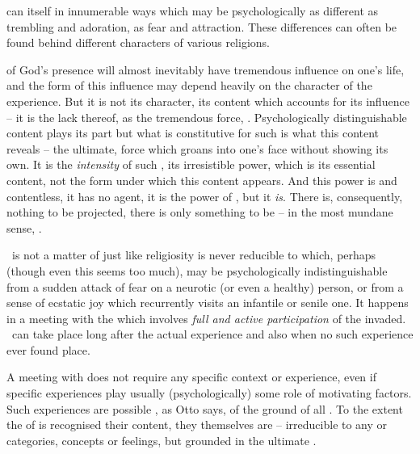  can  itself in innumerable ways which may be
psychologically as different as trembling and adoration, as fear and attraction.
These differences can often be found behind different  characters of
various religions.

 of God's presence will almost inevitably have tremendous
influence on one's life, and the form of this influence may depend heavily on
the character of the experience.  But it is not its character, its content which
accounts for its influence -- it is the lack thereof,  as the
tremendous force, .  Psychologically distinguishable content plays
its part but what is constitutive for such  is what this
content reveals -- the ultimate,  force which groans into one's
face without showing its own.  It is the {\em intensity} of such , its irresistible power, which is its essential content, not the
form under which this content appears.  And this power is  and
contentless, it has no agent, it is the power of , but it {\em
  is}. There is, consequently, nothing to be projected, there is only something
to be  -- in the most mundane sense, .

\pa \Sch\ is not a matter of  just like religiosity is never
reducible to  which, perhaps (though even this 
seems too much), may be psychologically indistinguishable from a sudden attack
of fear on a neurotic (or even a healthy) person, or from a sense of ecstatic
joy which recurrently visits an infantile or {senile} one. It happens in a
meeting with the  which involves {\em full and active
  participation} of the invaded.  \Sch\ can take place long after the actual
experience and also when no such experience ever found place.

A meeting with   does not require any specific
context or experience, even if specific experiences play usually
(psychologically) some role of motivating factors.  Such experiences are
possible , as Otto says,  of the  ground of all .  To the extent the  of
 is recognised  their content, they themselves are
 -- irreducible to any  or categories,
concepts or feelings, but grounded in the ultimate .

